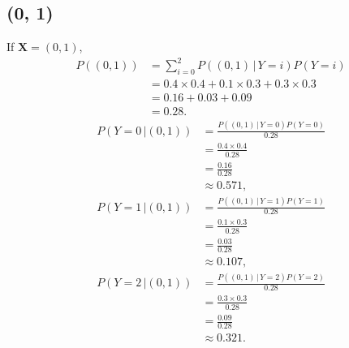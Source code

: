 \documentclass[10pt]{article}
\begin{document}
\subsection*{(0, 1)}
If $\textbf{X} = (0,1)$, 
\begin{align*}
P((0, 1)) &= \sum_{i = 0}^2 P((0, 1) \, | \, Y = i)P(Y = i) \\
             &= 0.4 \times 0.4 + 0.1 \times 0.3 + 0.3 \times 0.3 \\
             &= 0.16 + 0.03 + 0.09 \\
             &= 0.28.
\end{align*}
\begin{align*}
P(Y = 0 \, | (0,1)) &= \frac{P((0, 1) \, | \, Y = 0)P(Y = 0)}{ 0.28 } \\
                           &= \frac{0.4 \times 0.4}{ 0.28 } \\
                           &= \frac{0.16}{ 0.28 } \\
                           &\approx 0.571,
\end{align*}
\begin{align*}
P(Y = 1 \, | (0,1)) &= \frac{P((0, 1) \, | \, Y = 1)P(Y = 1)}{ 0.28 } \\
                           &= \frac{0.1 \times 0.3}{ 0.28 } \\
                           &= \frac{0.03 }{ 0.28 } \\
                           &\approx 0.107,
\end{align*}
\begin{align*}
P(Y = 2 \, | (0,1)) &= \frac{P((0, 1) \, | \, Y = 2)P(Y = 2)}{ 0.28 } \\
                           &= \frac{ 0.3 \times 0.3 }{ 0.28 } \\
                           &= \frac{ 0.09 }{ 0.28 } \\
                           &\approx 0.321.
\end{align*}
\end{document}
